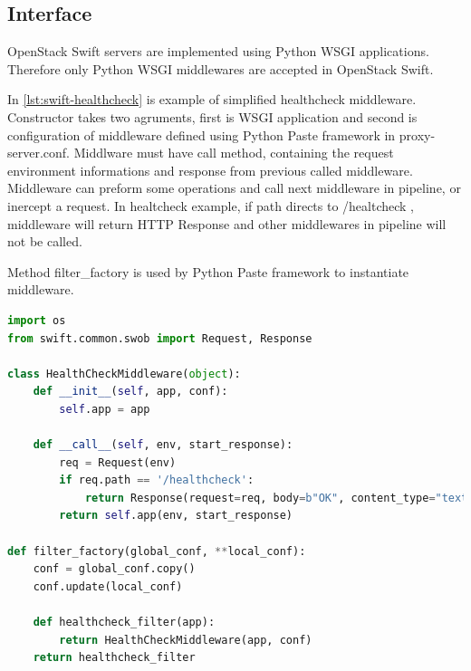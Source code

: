     \subsection{Interface}
    OpenStack Swift servers are implemented using Python WSGI applications. Therefore only Python WSGI middlewares are accepted in OpenStack Swift.

    In \ref{lst:swift-healthcheck} is example of simplified healthcheck middleware. Constructor takes two agruments, first is WSGI application and second is configuration of middleware defined using Python Paste framework in proxy-server.conf. Middlware must have call method, containing the request environment informations and response from previous called middleware. Middleware can preform some operations and call next middleware in pipeline, or inercept a request. In healtcheck example, if path directs to /healtcheck , middleware will return HTTP Response and other middlewares in pipeline will not be called.

    Method filter\_factory is used by Python Paste framework to instantiate middleware.

\begin{lstlisting}[language=Python, style=pythonStyle, caption=Example of healthcheck middleware in OpenStack Swift, label=lst:swift-healthcheck]
import os
from swift.common.swob import Request, Response

class HealthCheckMiddleware(object):
    def __init__(self, app, conf):
        self.app = app

    def __call__(self, env, start_response):
        req = Request(env)
        if req.path == '/healthcheck':
            return Response(request=req, body=b"OK", content_type="text/plain")(env, start_response)
        return self.app(env, start_response)

def filter_factory(global_conf, **local_conf):
    conf = global_conf.copy()
    conf.update(local_conf)

    def healthcheck_filter(app):
        return HealthCheckMiddleware(app, conf)
    return healthcheck_filter
\end{lstlisting}

